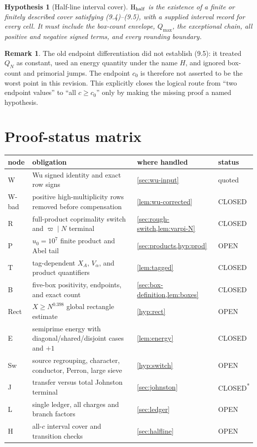 \documentclass[11pt]{article}
\newtheorem{hypothesis}[theorem]{Hypothesis}
\theoremstyle{definition}
\newtheorem{remark}[theorem]{Remark}
\newcommand{\openstatus}{\textcolor{red!75!black}{OPEN}}
\newcommand{\closedstatus}{\textcolor{green!45!black}{CLOSED}}
\begin{document}
\begin{hypothesis}[Half-line interval cover]
\label{hyp:half}
\(\mathrm{H}_{\rm half}\) is the existence of a finite or finitely described
cover satisfying (9.4)--(9.5), with a supplied interval record for every
cell.  It must include the box-count envelope, \(Q_{\max}\), the exceptional
chain, all positive and negative signed terms, and every rounding boundary.
\end{hypothesis}

\begin{remark}
The old endpoint differentiation did not establish (9.5): it treated
\(Q_N\) as constant, used an energy quantity under the name \(H\), and
ignored box-count and primorial jumps.  The endpoint \(c_0\) is therefore
not asserted to be the worst point in this revision.  This explicitly
closes the logical route from “two endpoint values” to “all \(c\ge c_0\)”
only by making the missing proof a named hypothesis.
\end{remark}

\section{Proof-status matrix}
\label{sec:status-matrix}

\begingroup
\scriptsize
\setlength{\tabcolsep}{2pt}
\begin{longtable}{p{}p{}p{}p{}}
\toprule
node&obligation&where handled&status\\
\midrule
W&Wu signed identity and exact row signs&\cref{sec:wu-input}&quoted\\
W-bad&positive high-multiplicity rows removed before compensation&
\cref{lem:wu-corrected}&\closedstatus\\
R&full-product coprimality switch and \(\varpi\mid N\) terminal&
\cref{sec:rough-switch,lem:varpi-N}&\closedstatus\\
P&\(u_0=10^7\) finite product and Abel tail&
\cref{sec:products,hyp:prod}&\openstatus\\
T&tag-dependent \(X_A\), \(V_\alpha\), and product quantifiers&
\cref{lem:tagged}&\closedstatus\\
B&five-box positivity, endpoints, and exact count&
\cref{sec:box-definition,lem:boxes}&\closedstatus\\
Rect&\(X\ge N^{0.398}\) global rectangle estimate&
\cref{hyp:rect}&\openstatus\\
E&semiprime energy with diagonal/shared/disjoint cases and \(+1\)&
\cref{lem:energy}&\closedstatus\\
Sw&source regrouping, character, conductor, Perron, large sieve&
\cref{hyp:switch}&\openstatus\\
J&transfer versus total Johnston terminal&\cref{sec:johnston}&\closedstatus\textsuperscript{*}\\
L&single ledger, all charges and branch factors&
\cref{sec:ledger}&\openstatus\\
H&all-\(c\) interval cover and transition checks&
\cref{sec:halfline}&\openstatus\\
\bottomrule
\end{longtable}
\endgroup
\end{document}
